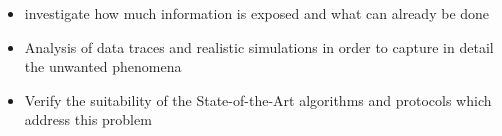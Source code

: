 \begin{itemize}
	\item investigate how much information is exposed and what can already be done
	\item Analysis of data traces and realistic simulations in order to capture in detail the unwanted phenomena
	\item Verify the suitability of the State-of-the-Art algorithms and protocols which address this problem
\end{itemize}













